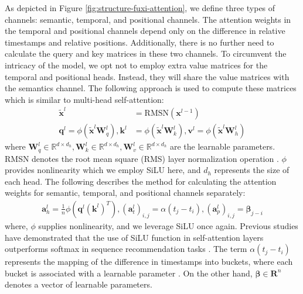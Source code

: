 As depicted in Figure \ref{fig:structure-fuxi-attention}, we define three types of channels: semantic, temporal, and positional channels. 
The attention weights in the temporal and positional channels depend only on the difference in relative timestamps and relative positions. 
Additionally, there is no further need to calculate the query and key matrices in these two channels. 
To circumvent the intricacy of the model, we opt not to employ extra value matrices for the temporal and positional heads. Instead, they will share the value matrices with the semantics channel. 
The following approach is used to compute these matrices which is similar to multi-head self-attention:
\begin{align}
    \tilde{\mathbf x}^{l} &= \text{RMSN}(\mathbf x^{l-1}) \\
    \mathbf q^{l} = \phi(\tilde{\mathbf x}^l\mathbf W_{q}^{l}),
    \mathbf k^{l} &= \phi(\tilde{\mathbf x}^l\mathbf W_{k}^{l}), 
    \mathbf v^{l} = \phi(\tilde{\mathbf x}^l\mathbf W_{h}^{l})
\end{align}
where $ \mathbf W_{q}^{l} \in \mathbb R^{d \times d_h}, \mathbf W_{k}^{l} \in \mathbb R^{d\times d_h}, \mathbf W_{v}^{l} \in \mathbb R^{d \times d_h} $ are the learnable parameters. 
RMSN denotes the root mean square (RMS) layer normalization operation \cite{DBLP:conf/nips/ZhangS19a}.
$\phi$ provides nonlinearity which we employ SiLU \cite{elfwing2018silu} here, and $ d_h $ represents the size of each head. The following describes the method for calculating the attention weights for semantic, temporal, and positional channels separately:
\begin{align}
    \mathbf a^{l}_h = \frac{1}{n}\phi(\mathbf q^{l}(\mathbf k^{l})^T), 
    (\mathbf a^{l}_t)_{i,j} = \alpha(t_j - t_i),     (\mathbf a^{l}_p)_{i,j} = \mathbf \beta_{j - i}
\end{align}
where, $\phi$ supplies nonlinearity, and we leverage SiLU once again. Previous studies have demonstrated that the use of SiLU function in self-attention layers outperforms softmax in sequence recommendation tasks \cite{zhai2024actions}. The term $\alpha(t_j - t_i)$ represents the mapping of the difference in timestamps into buckets, where each bucket is associated with a learnable parameter \cite{raffel2020t5}. On the other hand, \(\mathbf{\beta} \in \mathbf{R}^n\) denotes a vector of learnable parameters.

